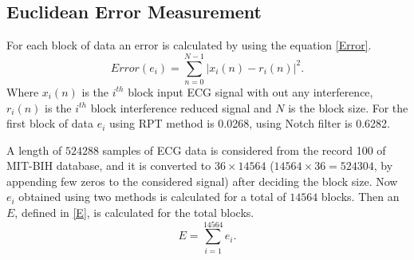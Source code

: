 \documentclass[conference]{IEEEtran}
\begin{document}
\subsection{Euclidean Error Measurement}
For each block of data an error is calculated by using the equation \eqref{Error}.
\begin{equation}
\label{Error}
Error (e_i) = \sum_{n=0}^{N-1}|{x_i}(n)-{r_i}(n)|^2.
\end{equation}
Where ${x_i}(n)$ is the $i^{th}$ block input ECG signal with out any interference, ${r_i}(n)$ is the $i^{th}$ block interference reduced signal and $N$ is the block size. For the first block of data ${e_i}$ using RPT method is 0.0268, using Notch filter is 0.6282.

A length of $524288$ samples of ECG data is considered from the record 100 of MIT-BIH database, and it is converted to $36\times14564$ ($14564\times36 = 524304$, by appending few zeros to the considered signal) after deciding the block size. Now ${e_i}$ obtained using two methods is calculated for a total of $14564$ blocks. Then an $E$, defined in \eqref{E}, is calculated for the total blocks.
\begin{equation}
\label{E}
E = \sum_{i=1}^{14564}{e_i}.
\end{equation} 
\end{document}
